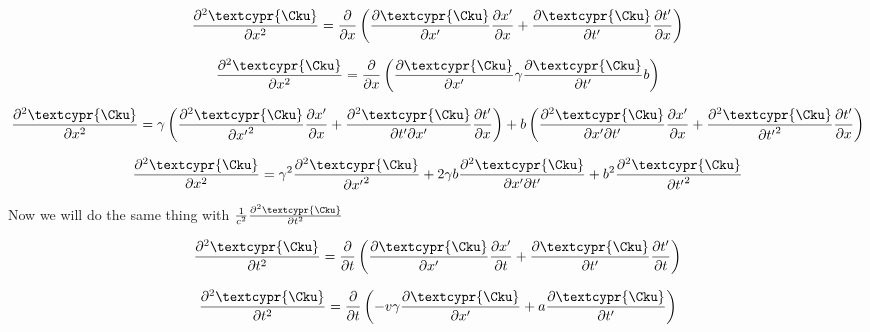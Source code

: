 \documentclass{article}
\begin{document}
\begin{equation}
\frac{\partial^2{\textcypr{\Cku}}}{\partial{x}^2} = \frac{\partial}{\partial{x}}\left( \frac{\partial{\textcypr{\Cku}}}{\partial{x'}}\frac{\partial{x'}}{\partial{x}} + \frac{\partial{\textcypr{\Cku}}}{\partial{t'}}\frac{\partial{t'}}{\partial{x}} \right)
\end{equation}

\begin{equation}
\frac{\partial^2{\textcypr{\Cku}}}{\partial{x}^2} = \frac{\partial}{\partial{x}}\left( \frac{\partial{\textcypr{\Cku}}}{\partial{x'}}\gamma \frac{\partial{\textcypr{\Cku}}}{\partial{t'}}b \right)
\end{equation}

\begin{equation}
\frac{\partial^2{\textcypr{\Cku}}}{\partial{x}^2} = \gamma\left( \frac{\partial^2{\textcypr{\Cku}}}{\partial{x'}^2}\frac{\partial{x'}}{\partial{x}} + \frac{\partial^2{\textcypr{\Cku}}}{\partial{t'}\partial{x'}}\frac{\partial{t'}}{\partial{x}} \right) + b \left( \frac{\partial^2{\textcypr{\Cku}}}{\partial{x'}\partial{t'}}\frac{\partial{x'}}{\partial{x}} + \frac{\partial^2{\textcypr{\Cku}}}{\partial{t'}^2}\frac{\partial{t'}}{\partial{x}} \right)
\end{equation}

\begin{equation}
\frac{\partial^2{\textcypr{\Cku}}}{\partial{x}^2} = \gamma^2\frac{\partial^2{\textcypr{\Cku}}}{\partial{x'}^2} + 2\gamma b\frac{\partial^2{\textcypr{\Cku}}}{\partial{x'}\partial{t'}} + b^2\frac{\partial^2{\textcypr{\Cku}}}{\partial{t'}^2}
\end{equation}

\bigskip

Now we will do the same thing with $\frac{1}{c^2}\frac{\partial^2{\textcypr{\Cku}}}{\partial{t}^2}$

\begin{equation}
\frac{\partial^2{\textcypr{\Cku}}}{\partial{t}^2} = \frac{\partial}{\partial{t}}\left(\frac{\partial{\textcypr{\Cku}}}{\partial{x'}}\frac{\partial{x'}}{\partial{t}} + \frac{\partial{\textcypr{\Cku}}}{\partial{t'}}\frac{\partial{t'}}{\partial{t}} \right)
\end{equation}

\begin{equation}
\frac{\partial^2{\textcypr{\Cku}}}{\partial{t}^2} = \frac{\partial}{\partial{t}} \left( -v\gamma\frac{\partial{\textcypr{\Cku}}}{\partial{x'}} + a\frac{\partial{\textcypr{\Cku}}}{\partial{t'}} \right)
\end{equation}
\end{document}
